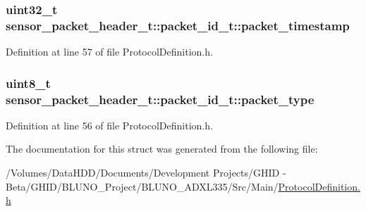 \hypertarget{structsensor__packet__header__t_1_1packet__id__t_a1b3a838cb32f36a3e72a4322c6c37a8d}{
\subsubsection[{packet\-\_\-timestamp}]{\setlength{\rightskip}{0pt plus 5cm}uint32\-\_\-t {\bf sensor\-\_\-packet\-\_\-header\-\_\-t\-::packet\-\_\-id\-\_\-t\-::packet\-\_\-timestamp}}}\label{structsensor__packet__header__t_1_1packet__id__t_a1b3a838cb32f36a3e72a4322c6c37a8d}


\-Definition at line 57 of file \-Protocol\-Definition.\-h.

\hypertarget{structsensor__packet__header__t_1_1packet__id__t_a653b5259acc7c834d3afc90ee1abed8a}{
\subsubsection[{packet\-\_\-type}]{\setlength{\rightskip}{0pt plus 5cm}uint8\-\_\-t {\bf sensor\-\_\-packet\-\_\-header\-\_\-t\-::packet\-\_\-id\-\_\-t\-::packet\-\_\-type}}}\label{structsensor__packet__header__t_1_1packet__id__t_a653b5259acc7c834d3afc90ee1abed8a}


\-Definition at line 56 of file \-Protocol\-Definition.\-h.



\-The documentation for this struct was generated from the following file\-:\begin{DoxyCompactItemize}
\item 
/\-Volumes/\-Data\-H\-D\-D/\-Documents/\-Development Projects/\-G\-H\-I\-D -\/ Beta/\-G\-H\-I\-D/\-B\-L\-U\-N\-O\-\_\-\-Project/\-B\-L\-U\-N\-O\-\_\-\-A\-D\-X\-L335/\-Src/\-Main/\hyperlink{_protocol_definition_8h}{\-Protocol\-Definition.\-h}\end{DoxyCompactItemize}
